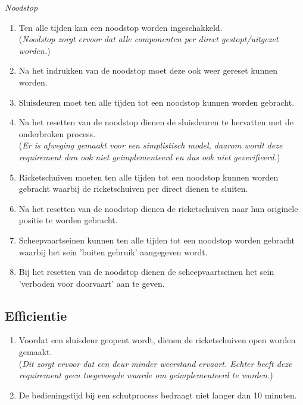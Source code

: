 \documentclass{article}
\begin{document}
        \newpage
        \noindent\textit{Noodstop}
        \begin{enumerate}
            \item Ten alle tijden kan een noodstop worden ingeschakkeld. \\
            (\textit{Noodstop zorgt ervoor dat alle componenten per direct gestopt/uitgezet worden.})
            \item Na het indrukken van de noodstop moet deze ook weer gereset kunnen worden.
            \item Sluisdeuren moet ten alle tijden tot een noodstop kunnen worden
            gebracht.
            \item Na het resetten van de noodstop dienen de sluisdeuren te hervatten
            met de onderbroken process. \\
            (\textit{Er is afweging gemaakt voor een simplistisch model,
            daarom wordt deze requirement dan ook niet geimplementeerd en dus ook niet geverifieerd.})
            \item Ricketschuiven moeten ten alle tijden tot een noodstop kunnen worden 
            gebracht waarbij de ricketschuiven per direct dienen te sluiten.
            \item Na het resetten van de noodstop dienen de ricketschuiven naar 
            hun originele positie te worden gebracht.
            \item Scheepvaartseinen kunnen ten alle tijden tot een noodstop worden
            gebracht waarbij het sein 'buiten gebruik' aangegeven wordt.
            \item Bij het resetten van de noodstop dienen de scheepvaartseinen
            het sein 'verboden voor doorvaart' aan te geven.
        \end{enumerate}

    \subsection{Efficientie}
        \begin{enumerate}
            \item Voordat een sluisdeur geopent wordt, dienen de ricketschuiven open 
            worden gemaakt. \\
            (\textit{Dit zorgt ervoor dat een deur minder weerstand ervaart. 
            Echter heeft deze requirement geen toegevoegde waarde om geimplementeerd te worden.})
            \item De bedieningstijd bij een schutprocess bedraagt niet langer dan 10 minuten.
        \end{enumerate}
\newpage
\end{document}
